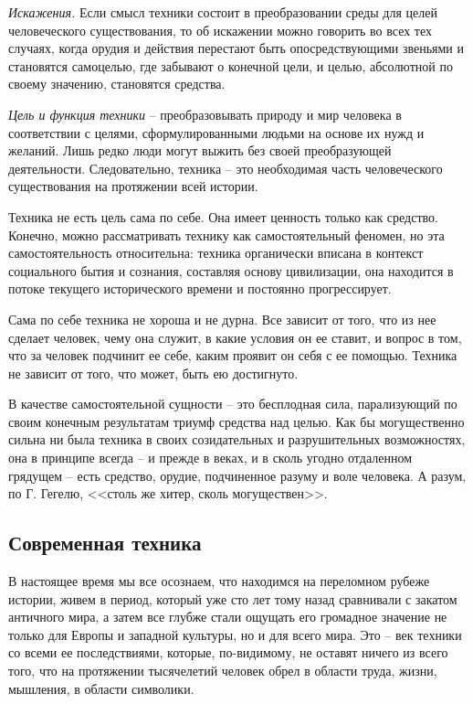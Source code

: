 \textit{Искажения.} Если смысл техники состоит в преобразовании среды для 
целей человеческого существования, то об искажении можно говорить во всех тех 
случаях, когда орудия и действия перестают быть опосредствующими звеньями и 
становятся самоцелью, где забывают о конечной цели, и целью, абсолютной по 
своему значению, становятся средства.\cite{bib:03}

\textit{Цель и функция техники} -- преобразовывать природу и мир человека в 
соответствии с целями, сформулированными людьми на основе их нужд и желаний. 
Лишь редко люди могут выжить без своей преобразующей деятельности. 
Следовательно, техника -- это необходимая часть человеческого существования на 
протяжении всей истории.

Техника не есть цель сама по себе. Она имеет ценность только как средство. 
Конечно, можно рассматривать технику как самостоятельный феномен, но эта 
самостоятельность относительна: техника органически вписана в контекст 
социального бытия и сознания, составляя основу цивилизации, она находится в 
потоке текущего исторического времени и постоянно прогрессирует.

Сама по себе техника не хороша и не дурна. Все зависит от того, что из нее 
сделает человек, чему она служит, в какие условия он ее ставит, и вопрос в 
том, что за человек подчинит ее себе, каким проявит он себя с ее помощью. 
Техника не зависит от того, что может, быть ею достигнуто.

В качестве самостоятельной сущности -- это бесплодная сила, парализующий по 
своим конечным результатам триумф средства над целью. Как бы могущественно 
сильна ни была техника в своих созидательных и разрушительных возможностях, 
она в принципе всегда -- и прежде в веках, и в сколь угодно отдаленном 
грядущем -- есть средство, орудие, подчиненное разуму и воле человека. А 
разум, по Г. Гегелю, <<столь же хитер, сколь могуществен>>.\cite{net:02}

\subsection{Современная техника}

В настоящее время мы все осознаем, что находимся на переломном рубеже истории, 
живем в период, который уже сто лет тому назад сравнивали с закатом античного 
мира, а затем все глубже стали ощущать его громадное значение не только для 
Европы и западной культуры, но и для всего мира. Это -- век техники со всеми 
ее последствиями, которые, по-видимому, не оставят ничего из всего того, что 
на протяжении тысячелетий человек обрел в области труда, жизни, мышления, в 
области символики.

